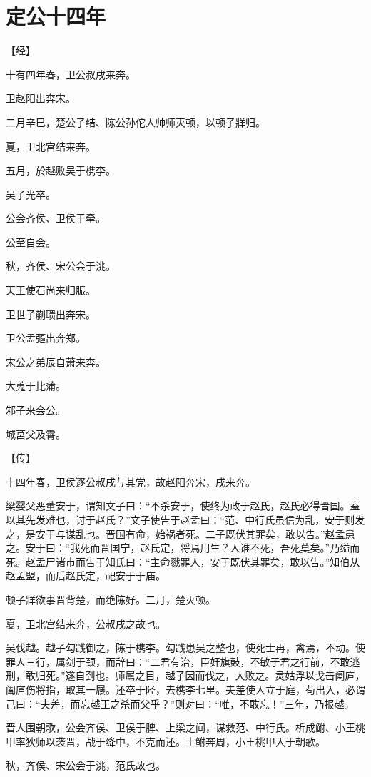 \documentclass[a4paper,12pt,UTF8,twoside]{ctexbook}
\begin{document}
\chapter{定公十四年}


【经】

十有四年春，卫公叔戌来奔。

卫赵阳出奔宋。

二月辛巳，楚公子结、陈公孙佗人帅师灭顿，以顿子牂归。

夏，卫北宫结来奔。

五月，於越败吴于槜李。

吴子光卒。

公会齐侯、卫侯于牵。

公至自会。

秋，齐侯、宋公会于洮。

天王使石尚来归脤。

卫世子蒯聩出奔宋。

卫公孟彄出奔郑。

宋公之弟辰自萧来奔。

大蒐于比蒲。

邾子来会公。

城莒父及霄。

【传】

十四年春，卫侯逐公叔戌与其党，故赵阳奔宋，戌来奔。

梁婴父恶董安于，谓知文子曰：“不杀安于，使终为政于赵氏，赵氏必得晋国。盍以其先发难也，讨于赵氏？”文子使告于赵孟曰：“范、中行氏虽信为乱，安于则发之，是安于与谋乱也。晋国有命，始祸者死。二子既伏其罪矣，敢以告。”赵孟患之。安于曰：“我死而晋国宁，赵氏定，将焉用生？人谁不死，吾死莫矣。”乃缢而死。赵孟尸诸市而告于知氏曰：“主命戮罪人，安于既伏其罪矣，敢以告。”知伯从赵孟盟，而后赵氏定，祀安于于庙。

顿子牂欲事晋背楚，而绝陈好。二月，楚灭顿。

夏，卫北宫结来奔，公叔戌之故也。

吴伐越。越子勾践御之，陈于槜李。勾践患吴之整也，使死士再，禽焉，不动。使罪人三行，属剑于颈，而辞曰：“二君有治，臣奸旗鼓，不敏于君之行前，不敢逃刑，敢归死。”遂自刭也。师属之目，越子因而伐之，大败之。灵姑浮以戈击阖庐，阖庐伤将指，取其一屦。还卒于陉，去槜李七里。夫差使人立于庭，苟出入，必谓己曰：“夫差，而忘越王之杀而父乎？”则对曰：“唯，不敢忘！”三年，乃报越。

晋人围朝歌，公会齐侯、卫侯于脾、上梁之间，谋救范、中行氏。析成鲋、小王桃甲率狄师以袭晋，战于绛中，不克而还。士鲋奔周，小王桃甲入于朝歌。

秋，齐侯、宋公会于洮，范氏故也。
\end{document}
